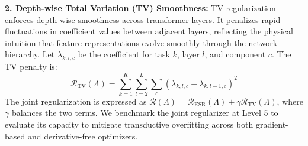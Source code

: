 \textbf{2. Depth-wise Total Variation (TV) Smoothness:} 
TV regularization enforces depth-wise smoothness across transformer layers. 
It penalizes rapid fluctuations in coefficient values between adjacent layers, reflecting the physical intuition that feature representations evolve smoothly through the network hierarchy. 
Let $\lambda_{k, l, c}$ be the coefficient for task $k$, layer $l$, and component $c$. 
The TV penalty is:
\begin{equation}
\mathcal{R}_{\text{TV}}(\Lambda) = \sum_{k=1}^K \sum_{l=2}^{L} \sum_{c} \left( \lambda_{k, l, c} - \lambda_{k, l-1, c} \right)^2
\end{equation}
The joint regularization is expressed as $\mathcal{R}(\Lambda) = \mathcal{R}_{\text{ESR}}(\Lambda) + \gamma \mathcal{R}_{\text{TV}}(\Lambda)$, where $\gamma$ balances the two terms.
We benchmark the joint regularizer at Level 5 to evaluate its capacity to mitigate transductive overfitting across both gradient-based and derivative-free optimizers.
